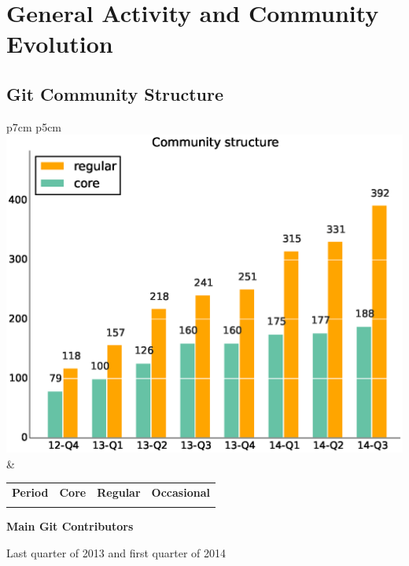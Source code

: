 \documentclass[a4wide,11pt]{report}
\begin{document}
\chapter{General Activity and Community Evolution}

\section{Git Community Structure}

\begin{tabular}{p{7cm} p{5cm}}
    \vspace{0pt} 
    \includegraphics[scale=.35]{figs/onion.eps}
    & 
    \vspace{0pt}
    \begin{tabular}{l|r|r|r|}%
    \bfseries Period & \bfseries Core & \bfseries Regular & \bfseries Occasional%
    \csvreader[head to column names]{data/onion_model.csv}{}%
    {\\ & \core & \regular & \occasional}
    \end{tabular}
\end{tabular}

\textbf{Main Git Contributors}

Last quarter of 2013 and first quarter of 2014
\end{document}
